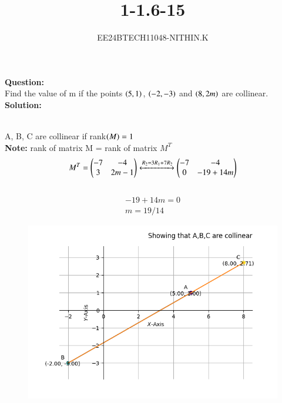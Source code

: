 \documentclass[journal]{IEEEtran}
\numberwithin{equation}{enumi}
\numberwithin{figure}{enumi}
\begin{document}


\title{1-1.6-15}
\author{EE24BTECH11048-NITHIN.K}
{\let\newpage\relax\maketitle}

\textbf{Question:} \\
Find the value of m if the points $\left(5, 1\right)$, $\left(-2, -3\right)$ and $\left(8, 2m\right)$ are collinear. \\
\textbf{Solution:} \\
\begin{table}[h!]   
      \centering
      
      \caption{}
\end{table} \\
A, B, C are collinear if rank$\left(M\right) = 1$ \\
\textbf{Note:} rank of matrix M = rank of matrix $M^T$ \\
 \begin{align}
	 M^T = \begin{pmatrix}
		 -7 & -4 \\
		 3 & 2m-1\end{pmatrix}
	 \xleftrightarrow{\substack{R_2 = 3R_1 + 7R_2}}
	 \begin{pmatrix}
		 -7 & -4 \\
		 0 & -19+14m\end{pmatrix}
 \end{align}
 \\
 \begin{align}
	 -19+14m=0 \\
	 m=19/14
 \end{align}
\begin{figure}[h]
\centering
\includegraphics[width=0.7\linewidth]{figs/Figure_1.png}
\caption{}
\label{graph}
\end{figure}
\end{document}
